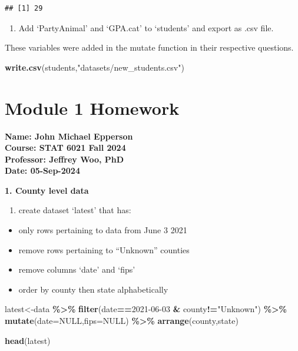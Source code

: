 \documentclass[
  openany]{book}
\newenvironment{Shaded}{\begin{snugshade}}{\end{snugshade}}
\newcommand{\AttributeTok}[1]{\textcolor[rgb]{0.13,0.29,0.53}{#1}}
\newcommand{\ConstantTok}[1]{\textcolor[rgb]{0.56,0.35,0.01}{#1}}
\newcommand{\FunctionTok}[1]{\textcolor[rgb]{0.13,0.29,0.53}{\textbf{#1}}}
\newcommand{\NormalTok}[1]{#1}
\newcommand{\OtherTok}[1]{\textcolor[rgb]{0.56,0.35,0.01}{#1}}
\newcommand{\SpecialCharTok}[1]{\textcolor[rgb]{0.81,0.36,0.00}{\textbf{#1}}}
\newcommand{\StringTok}[1]{\textcolor[rgb]{0.31,0.60,0.02}{#1}}
\providecommand{\tightlist}{%
  \setlength{\itemsep}{0pt}\setlength{\parskip}{0pt}}
\begin{document}
\begin{verbatim}
## [1] 29
\end{verbatim}

\begin{enumerate}
\def\labelenumi{\arabic{enumi}.}
\setcounter{enumi}{8}
\tightlist
\item
  Add `PartyAnimal' and `GPA.cat' to `students' and export as .csv file.
\end{enumerate}

These variables were added in the mutate function in their respective questions.

\begin{Shaded}
\begin{Highlighting}[]
\FunctionTok{write.csv}\NormalTok{(students,}\StringTok{"datasets/new\_students.csv"}\NormalTok{)}
\end{Highlighting}
\end{Shaded}

\chapter*{Module 1 Homework}\label{module-1-homework}

\textbf{Name: John Michael Epperson\\
Course: STAT 6021 \textbar{} Fall 2024\\
Professor: Jeffrey Woo, PhD\\
Date: 05-Sep-2024}

\textbf{1. County level data}

\begin{enumerate}
\def\labelenumi{\alph{enumi}.}
\tightlist
\item
  create dataset `latest' that has:
\end{enumerate}

\begin{itemize}
\tightlist
\item
  only rows pertaining to data from June 3 2021
\item
  remove rows pertaining to ``Unknown'' counties
\item
  remove columns `date' and `fips'
\item
  order by county then state alphabetically
\end{itemize}

\begin{Shaded}
\begin{Highlighting}[]
\NormalTok{latest}\OtherTok{\textless{}{-}}\NormalTok{data }\SpecialCharTok{\%\textgreater{}\%} 
  \FunctionTok{filter}\NormalTok{(date}\SpecialCharTok{==}\StringTok{\textquotesingle{}2021{-}06{-}03\textquotesingle{}} \SpecialCharTok{\&}\NormalTok{ county}\SpecialCharTok{!=}\StringTok{"Unknown"}\NormalTok{) }\SpecialCharTok{\%\textgreater{}\%} 
  \FunctionTok{mutate}\NormalTok{(}\AttributeTok{date=}\ConstantTok{NULL}\NormalTok{,}\AttributeTok{fips=}\ConstantTok{NULL}\NormalTok{) }\SpecialCharTok{\%\textgreater{}\%} 
  \FunctionTok{arrange}\NormalTok{(county,state)}
  

\FunctionTok{head}\NormalTok{(latest)}
\end{Highlighting}
\end{Shaded}
\end{document}
